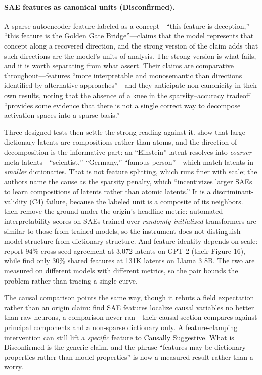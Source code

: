 \documentclass{article}
\begin{document}
\paragraph{SAE features as canonical units (Disconfirmed).} A sparse-autoencoder feature labeled as a concept---``this feature is deception,'' ``this feature is the Golden Gate Bridge''---claims that the model represents that concept along a recovered direction, and the strong version of the claim adds that such directions are the model's units of analysis. The strong version is what fails, and it is worth separating from what \citet{cunningham2023sparse} assert. Their claims are comparative throughout---features ``more interpretable and monosemantic than directions identified by alternative approaches''---and they anticipate non-canonicity in their own results, noting that the absence of a knee in the sparsity--accuracy tradeoff ``provides some evidence that there is not a single correct way to decompose activation spaces into a sparse basis.''

Three designed tests then settle the strong reading against it. \citet{leask2025canonical} show that large-dictionary latents are compositions rather than atoms, and the direction of decomposition is the informative part: an ``Einstein'' latent resolves into \emph{coarser} meta-latents---``scientist,'' ``Germany,'' ``famous person''---which match latents in \emph{smaller} dictionaries. That is not feature splitting, which runs finer with scale; the authors name the cause as the sparsity penalty, which ``incentivizes larger SAEs to learn compositions of latents rather than atomic latents.'' It is a discriminant-validity (C4) failure, because the labeled unit is a composite of its neighbors. \citet{heap2025sparse} then remove the ground under the origin's headline metric: automated interpretability scores on SAEs trained over \emph{randomly initialized} transformers are similar to those from trained models, so the instrument does not distinguish model structure from dictionary structure. And feature identity depends on scale: \citet{leask2025canonical} report 94\% cross-seed agreement at 3{,}072 latents on GPT-2 (their Figure 16), while \citet{paulo2025sparse} find only 30\% shared features at 131K latents on Llama 3 8B. The two are measured on different models with different metrics, so the pair bounds the problem rather than tracing a single curve.

The causal comparison points the same way, though it rebuts a field expectation rather than an origin claim: \citet{mueller2025mib} find SAE features localize causal variables no better than raw neurons, a comparison \citet{cunningham2023sparse} never ran---their causal section compares against principal components and a non-sparse dictionary only. A feature-clamping intervention can still lift a \emph{specific} feature to Causally Suggestive. What is Disconfirmed is the generic claim, and the phrase ``features may be dictionary properties rather than model properties'' is now a measured result rather than a worry.
\end{document}
